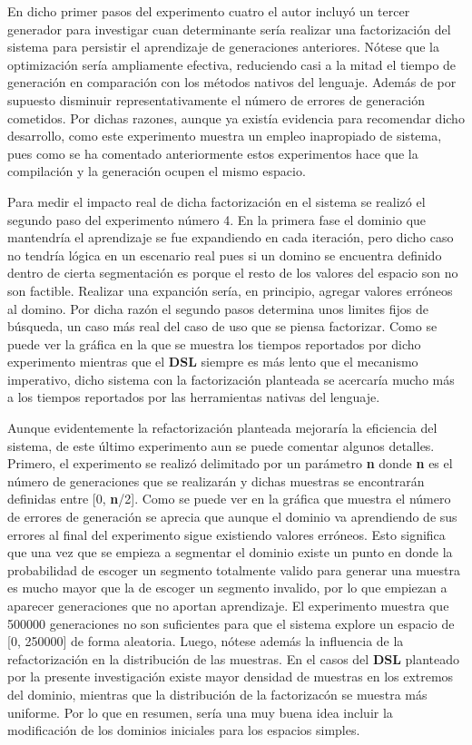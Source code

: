 En dicho primer pasos del experimento cuatro el autor incluyó un tercer generador para investigar cuan determinante sería
realizar una factorización del sistema para persistir el aprendizaje de generaciones anteriores. Nótese que la optimización
sería ampliamente efectiva, reduciendo casi a la mitad el tiempo de generación en comparación con los métodos nativos del
lenguaje. Además de por supuesto disminuir representativamente el número de errores de generación cometidos. Por dichas
razones, aunque ya existía evidencia para recomendar dicho desarrollo, como este experimento muestra un empleo inapropiado de
sistema, pues como se ha comentado anteriormente estos experimentos hace que la compilación y la generación ocupen el mismo
espacio.

Para medir el impacto real de dicha factorización en el sistema se realizó el segundo paso del experimento número 4. En la
primera fase el dominio que mantendría el aprendizaje se fue expandiendo en cada iteración, pero dicho caso no tendría lógica
en un escenario real pues si un domino se encuentra definido dentro de cierta segmentación es porque el resto de los valores
del espacio son no son factible. Realizar una expanción sería, en principio, agregar valores erróneos al domino. Por dicha razón
el segundo pasos determina unos limites fijos de búsqueda, un caso más real del caso de uso que se piensa factorizar. Como se
puede ver la gráfica en la que se muestra los tiempos reportados por dicho experimento mientras que el {\bf DSL} siempre es más lento
que el mecanismo imperativo, dicho sistema con la factorización planteada se acercaría mucho más a los tiempos reportados por
las herramientas nativas del lenguaje.

Aunque evidentemente la refactorización planteada mejoraría la eficiencia del sistema, de este último experimento aun se puede
comentar algunos detalles. Primero, el experimento se realizó delimitado por un parámetro {\bf n} donde {\bf n} es el número de generaciones
que se realizarán y dichas muestras se encontrarán definidas entre [0, {\bf n}/2]. Como se puede ver en la gráfica que muestra el
número de errores de generación se aprecia que aunque el dominio va aprendiendo de sus errores al final del experimento sigue
existiendo valores erróneos. Esto significa que una vez que se empieza a segmentar el dominio existe un punto en donde la
probabilidad de escoger un segmento totalmente valido para generar una muestra es mucho mayor que la de escoger un segmento
invalido, por lo que empiezan a aparecer generaciones que no aportan aprendizaje. El experimento muestra que 500000
generaciones no son suficientes para que el sistema explore un espacio de [0, 250000] de forma aleatoria.
Luego, nótese además la influencia de la refactorización en la distribución de las muestras. En el casos del {\bf DSL} planteado
por la presente investigación existe mayor densidad de muestras en los extremos del dominio, mientras que la distribución
de la factorizacón se muestra más uniforme. Por lo que en resumen, sería una muy buena idea incluir la modificación de los
dominios iniciales para los espacios simples.

